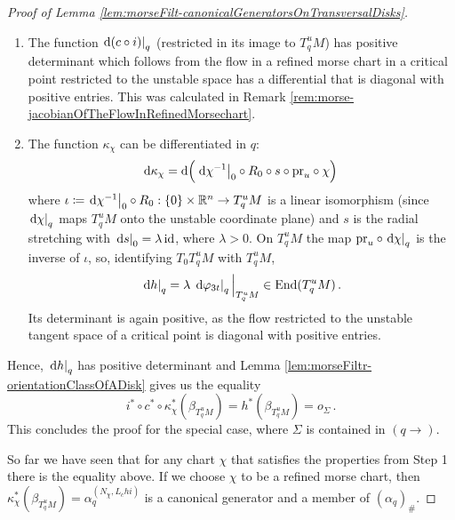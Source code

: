 \begin{proof}[Proof of Lemma \ref{lem:morseFilt-canonicalGeneratorsOnTransversalDisks}]
	 \begin{enumerate}
		\item The function $\left.\mathop{}\!\mathrm{d} (c\circ i)\right|_{q}$ (restricted in its image to $T^u_qM$) has positive determinant which follows from the flow in a refined morse chart in a critical point restricted to the unstable space has a differential that is diagonal with positive entries. This was calculated in Remark \ref{rem:morse-jacobianOfTheFlowInRefinedMorsechart}.
		\item The function $\kappa_\chi$ can be differentiated in $q$:
		\begin{equation*}
			\mathop{}\!\mathrm{d} \kappa_{\chi}=\mathop{}\!\mathrm{d} \Big(\left.\mathop{}\!\mathrm{d} \chi^{-1}\right|_{0}\circ R_0\circ s\circ \mathrm{pr}_u\circ \chi \Big)\,
		\end{equation*}
		 where $\iota\coloneq\left.\mathop{}\!\mathrm{d}\chi^{-1}\right|_{0}\circ R_0:\{0\}\times\mathbb{R}^{n}\to T^u_qM$ is a linear isomorphism (since $\left.\mathop{}\!\mathrm{d}\chi\right|_{q}$ maps $T^u_qM$ onto the unstable coordinate plane) and $s$ is the radial stretching with $\left.\mathop{}\!\mathrm{d} s\right|_{0}=\lambda \operatorname{\mathrm{id}}$, where $\lambda>0$. On $T^u_qM$ the map $\mathrm{pr}_u\circ\left.\mathop{}\!\mathrm{d}\chi\right|_{q}$ is the inverse of $\iota$, so, identifying $T_0T^u_qM$ with $T^u_qM$,
\begin{equation*}
	\left.\mathop{}\!\mathrm{d} h\right|_{q}=\lambda\,\left.\mathop{}\!\mathrm{d}\varphi_{3t}\right|_{q}\Big|_{T^u_qM}\in\operatorname{End}(T^u_qM)\,.
\end{equation*}
Its determinant is again positive, as the flow restricted to the unstable tangent space of a critical point is diagonal with positive entries.
	 \end{enumerate}
Hence, $\left.\mathop{}\!\mathrm{d} h\right|_{q}$ has positive determinant and Lemma \ref{lem:morseFiltr-orientationClassOfADisk} gives us the equality
\begin{equation*}
	i^*\circ c^*\circ \kappa_{\chi}^*(\beta_{T^u_qM})=h^*(\beta_{T^u_qM})=o_{\Sigma}\,.
\end{equation*} This concludes the proof for the special case, where $\Sigma$ is contained in $(q\to)$.

So far we have seen that for any chart $\chi$ that satisfies the properties from Step 1 there is the equality above. If we choose $\chi$ to be a refined morse chart, then $\kappa_{\chi}^*(\beta_{T^u_qM})=\alpha_q^{(N_\chi,L_chi)}$ is a canonical generator and a member of $(\alpha_q)_{\#}$.


\end{proof}
